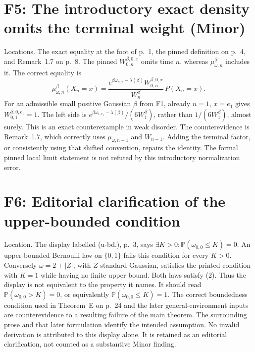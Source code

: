 \documentclass[10pt]{article}
\begin{document}
\section*{F5: The introductory exact density omits the terminal weight (Minor)}
Locations. The exact equality at the foot of p. 1, the pinned definition on p. 4, and Remark 1.7 on p. 8. The pinned \(W_{0,n}^{\beta,0,x}\) omits time \(n\), whereas \(\mu^\beta_{\omega,n}\) includes it. The correct equality is \[\mu^\beta_{\omega,n}(X_n=x)
 =\frac{e^{\beta\omega_{n,x}-\lambda(\beta)}
             W_{0,n}^{\beta,0,x}}{W_n^\beta}\,P(X_n=x).\] For an admissible small positive Gaussian \(\beta\) from F1, already \(n=1\), \(x=e_1\) gives \(W_{0,1}^{\beta,0,e_1}=1\). The left side is \(e^{\beta\omega_{1,e_1}-\lambda(\beta)}/(6W_1^\beta)\), rather than \(1/(6W_1^\beta)\), almost surely. This is an exact counterexample in weak disorder. The counterevidence is Remark 1.7, which correctly uses \(\mu_{\omega,n-1}\) and \(W_{n-1}\). Adding the terminal factor, or consistently using that shifted convention, repairs the identity. The formal pinned local limit statement is not refuted by this introductory normalization error.\par
\section*{F6: Editorial clarification of the upper-bounded condition}
Location. The display labelled (u-bd.), p. 3, says \(\exists K>0:\mathbb P(\omega_{0,0}\leq K)=0\). An upper-bounded Bernoulli law on \(\{0,1\}\) fails this condition for every \(K>0\). Conversely \(\omega=2+|Z|\), with \(Z\) standard Gaussian, satisfies the printed condition with \(K=1\) while having no finite upper bound. Both laws satisfy (2). Thus the display is not equivalent to the property it names. It should read \(\mathbb P(\omega_{0,0}>K)=0\), or equivalently \(\mathbb P(\omega_{0,0}\leq K)=1\). The correct boundedness condition used in Theorem E on p. 24 and the later general-environment inputs are counterevidence to a resulting failure of the main theorem. The surrounding prose and that later formulation identify the intended assumption. No invalid derivation is attributed to this display alone. It is retained as an editorial clarification, not counted as a substantive Minor finding.\par
\end{document}
